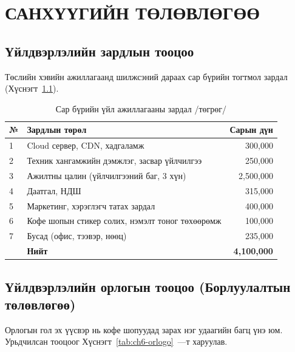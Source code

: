 \chapter{САНХҮҮГИЙН ТӨЛӨВЛӨГӨӨ}

\section{Үйлдвэрлэлийн зардлын тооцоо}

Төслийн хэвийн ажиллагаанд шилжсэний дараах сар бүрийн тогтмол
зардал (Хүснэгт~\ref{tab:ch6-zardal}).

\begin{table}[h]
  \centering
  \caption{Сар бүрийн үйл ажиллагааны зардал /төгрөг/}
  \label{tab:ch6-zardal}
  \small
  \begin{tabular}{@{}p{0.8cm}p{7.6cm}r@{}}
    \toprule
    \textbf{№} & \textbf{Зардлын төрөл} & \textbf{Сарын дүн} \\
    \midrule
    1 & Cloud сервер, CDN, хадгаламж & 300{,}000 \\
    2 & Техник хангамжийн дэмжлэг, засвар үйлчилгээ & 250{,}000 \\
    3 & Ажилтны цалин (үйлчилгээний баг, 3 хүн) & 2{,}500{,}000 \\
    4 & Даатгал, НДШ & 315{,}000 \\
    5 & Маркетинг, хэрэглэгч татах зардал & 400{,}000 \\
    6 & Кофе шопын стикер солих, нэмэлт тоног төхөөрөмж & 100{,}000 \\
    7 & Бусад (офис, тээвэр, нөөц) & 235{,}000 \\
    \midrule
    & \textbf{Нийт} & \textbf{4{,}100{,}000} \\
    \bottomrule
  \end{tabular}
\end{table}

\section{Үйлдвэрлэлийн орлогын тооцоо (Борлуулалтын төлөвлөгөө)}

Орлогын гол эх үүсвэр нь кофе шопуудад зарах нэг удаагийн багц үнэ юм.
Урьдчилсан тооцоог Хүснэгт~\ref{tab:ch6-orlogo}~—т харуулав.

